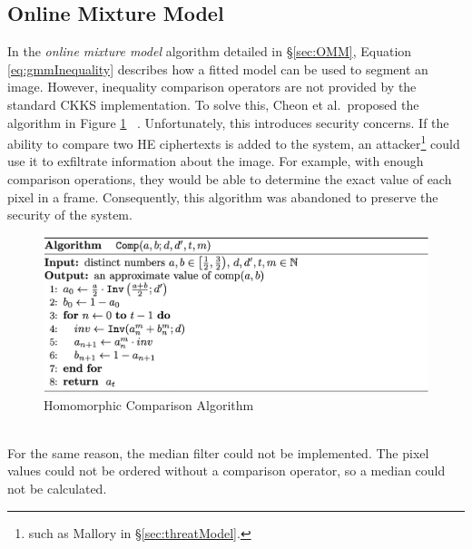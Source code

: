 \subsection{Online Mixture Model}
\setlength{\leftskip}{0.5cm}
\indent \indent
In the \textit{online mixture model} algorithm detailed in §\ref{sec:OMM}, Equation \ref{eq:gmmInequality} describes how a fitted model can be used to segment an image. However, inequality comparison operators are not provided by the standard CKKS implementation. To solve this, Cheon et al.\ proposed the algorithm in Figure \ref{fig:comparison} ~\cite{Comparison}. Unfortunately, this introduces security concerns. If the ability to compare two HE ciphertexts is added to the system, an attacker\footnote{such as Mallory in §\ref{sec:threatModel}.} could use it to exfiltrate information about the image. For example, with enough comparison operations, they would be able to determine the exact value of each pixel in a frame. Consequently, this algorithm was abandoned to preserve the security of the system.
\begin{figure}
    \centering
    \includegraphics[width=\textwidth]{figures/algorithm1}
    \caption{Homomorphic Comparison Algorithm}
    \label{fig:comparison}
\end{figure}
\smallskip \\ \indent
For the same reason, the median filter could not be implemented. The pixel values could not be ordered without a comparison operator, so a median could not be calculated.


\setlength{\leftskip}{0cm}
